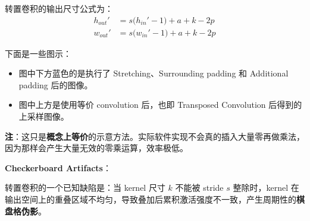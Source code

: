 转置卷积的输出尺寸公式为： \[
\begin{aligned}
h_{out}' &= s\bigl(h_{in}' - 1\bigr) + a + k - 2p \\
w_{out}' &= s\bigl(w_{in}' - 1\bigr) + a + k - 2p
\end{aligned}
\]

下面是一些图示：

\begin{itemize}
\tightlist
\item
  图中下方蓝色的是执行了 Stretching、Surrounding padding 和 Additional
  padding 后的图像。
\item
  图中上方是使用等价 convolution 后，也即 Transposed Convolution
  后得到的上采样图像。
\end{itemize}







\textbf{注}：这只是\textbf{概念上等价}的示意方法。实际软件实现不会真的插入大量零再做乘法，因为那样会产生大量无效的零乘运算，效率极低。

\textbf{Checkerboard Artifacts}：

转置卷积的一个已知缺陷是：当 kernel 尺寸 \(k\) 不能被 stride \(s\)
整除时，kernel
在输出空间上的重叠区域不均匀，导致叠加后累积激活强度不一致，产生周期性的\textbf{棋盘格伪影}。

